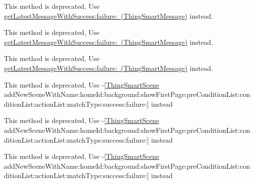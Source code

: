 \begin{DoxyRefList}
\label{deprecated__deprecated000183}%
%
This method is deprecated, Use \mbox{\hyperlink{interface_thing_smart_message_a004b181c6a0820da778c59f4564685e0}{get\+Latest\+Message\+With\+Success\+:failure\+: (\+Thing\+Smart\+Message)}} instead. 

\label{deprecated__deprecated000197}%
%
This method is deprecated, Use \mbox{\hyperlink{interface_thing_smart_message_a004b181c6a0820da778c59f4564685e0}{get\+Latest\+Message\+With\+Success\+:failure\+: (\+Thing\+Smart\+Message)}} instead. 

\label{deprecated__deprecated000190}%
%
This method is deprecated, Use \mbox{\hyperlink{interface_thing_smart_message_a004b181c6a0820da778c59f4564685e0}{get\+Latest\+Message\+With\+Success\+:failure\+: (\+Thing\+Smart\+Message)}} instead.  
\item[Member \mbox{\hyperlink{interface_thing_smart_scene_aaa714cd759a3f99405307f44f26f0225}{\mbox{[}Thing\+Smart\+Scene add\+New\+Scene\+With\+Name\+:home\+Id\+:background\+:show\+First\+Page\+:condition\+List\+:action\+List\+:match\+Type\+:success\+:failure\+:\mbox{]}}} ]\label{deprecated__deprecated000075}%
%
This method is deprecated, Use -\/\mbox{[}\mbox{\hyperlink{interface_thing_smart_scene}{Thing\+Smart\+Scene}} add\+New\+Scene\+With\+Name\+:home\+Id\+:background\+:show\+First\+Page\+:pre\+Condition\+List\+:condition\+List\+:action\+List\+:match\+Type\+:success\+:failure\+:\mbox{]} instead 

\label{deprecated__deprecated000087}%
%
This method is deprecated, Use -\/\mbox{[}\mbox{\hyperlink{interface_thing_smart_scene}{Thing\+Smart\+Scene}} add\+New\+Scene\+With\+Name\+:home\+Id\+:background\+:show\+First\+Page\+:pre\+Condition\+List\+:condition\+List\+:action\+List\+:match\+Type\+:success\+:failure\+:\mbox{]} instead 

\label{deprecated__deprecated000079}%
%
This method is deprecated, Use -\/\mbox{[}\mbox{\hyperlink{interface_thing_smart_scene}{Thing\+Smart\+Scene}} add\+New\+Scene\+With\+Name\+:home\+Id\+:background\+:show\+First\+Page\+:pre\+Condition\+List\+:condition\+List\+:action\+List\+:match\+Type\+:success\+:failure\+:\mbox{]} instead 


\end{DoxyRefList}
